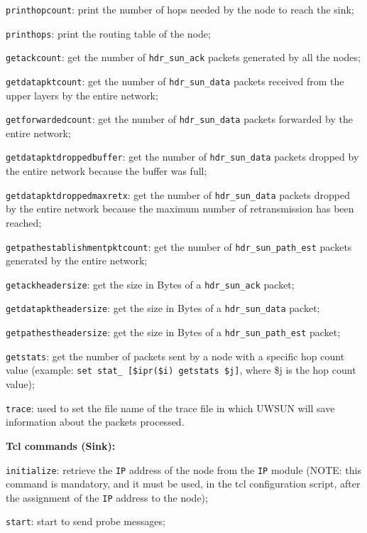 \begin{description}
\begin{description}
    \item {\tt printhopcount}: print the number of hops needed by the node to reach the sink;
    \item {\tt printhops}: print the routing table of the node;
    \item {\tt getackcount}: get the number of {\tt hdr\_sun\_ack} packets generated by all the nodes;
    \item {\tt getdatapktcount}: get the number of {\tt hdr\_sun\_data} packets received from the upper layers by the entire network;
    \item {\tt getforwardedcount}: get the number of {\tt hdr\_sun\_data} packets forwarded by the entire network;
    \item {\tt getdatapktdroppedbuffer}: get the number of {\tt hdr\_sun\_data} packets dropped by the entire network because the buffer was full;
    \item {\tt getdatapktdroppedmaxretx}: get the number of {\tt hdr\_sun\_data} packets dropped by the entire network because the maximum number of retransmission has been reached;
    \item {\tt getpathestablishmentpktcount}: get the number of {\tt hdr\_sun\_path\_est} packets generated by the entire network;
    \item {\tt getackheadersize}: get the size in Bytes of a {\tt hdr\_sun\_ack} packet;
    \item {\tt getdatapktheadersize}: get the size in Bytes of a {\tt hdr\_sun\_data} packet;
    \item {\tt getpathestheadersize}: get the size in Bytes of a {\tt hdr\_sun\_path\_est} packet;
    \item {\tt getstats}: get the number of packets sent by a node with a specific hop count value (example: {\tt set stat\_ [\$ipr(\$i) getstats \$j]}, where \$j is the hop count value);
    \item {\tt trace}: used to set the file name of the trace file in which UWSUN will save information about the packets processed.
    \end{description}
   \item {\bf Tcl commands (Sink):} 
    \begin{description}
    \item {\tt initialize}: retrieve the {\tt IP} address of the node from the {\tt IP} module (NOTE: this command is mandatory, and it must be used, in the tcl configuration script, after the assignment of the {\tt IP} address to the node);
    \item {\tt start}: start to send probe messages;

\end{description}
\end{description}
